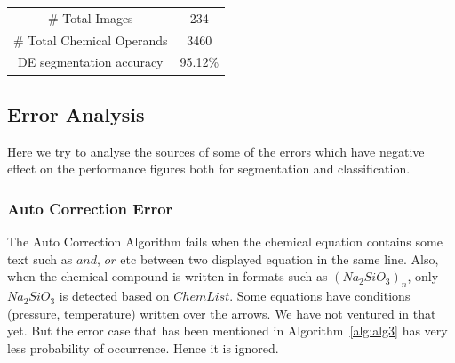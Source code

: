 \documentclass[oneside,a4paper,12pt]{book}
\begin{document}
\begin{table}[!htb]
\centering
\begin{tabular}{|c|c|}
\cline{1-2} 
{\color[HTML]{000000} \# Total Images}                     & 234   \\ 	\cline{1-2}
{\color[HTML]{000000} \# Total Chemical Operands}                        & 3460    \\ \cline{1-2}
{\color[HTML]{000000} DE segmentation accuracy}            & 95.12\% \\ \cline{1-2}
\end{tabular}
\label{table:result}
\end{table}


\subsection{Error Analysis}
Here we try to analyse the sources of some of the errors which have negative effect on the performance figures both for segmentation and classification.

\subsubsection{Auto Correction Error}
The Auto Correction Algorithm fails when the chemical equation contains some text such as $and$, $or$ etc between two displayed equation in the same line. Also, when the chemical compound is written in formats such as $(Na_2SiO_3)_n$, only $Na_2SiO_3$ is detected based on $ChemList$. Some equations have conditions (pressure, temperature) written over the arrows. We have not ventured in that yet. But the error case that has been mentioned in Algorithm~\ref{alg:alg3} has very less probability of occurrence. Hence it is ignored.
\end{document}

